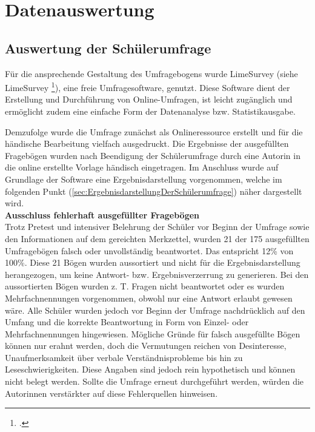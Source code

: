 \section{Datenauswertung}
\label{sec:Datenauswertung}

\subsection{Auswertung der Schülerumfrage}
\label{sec:AuswertungDerSchülerumfrage}

Für die ansprechende Gestaltung des Umfragebogens wurde LimeSurvey (siehe LimeSurvey \footcite {LimeSurvey2015}), eine freie Umfragesoftware, genutzt. Diese Software dient der Erstellung und Durchführung von Online-Umfragen, ist leicht zugänglich und ermöglicht zudem eine einfache Form der Datenanalyse bzw. Statistikausgabe.

Demzufolge wurde die Umfrage zunächst als Onlineressource erstellt und für die händische Bearbeitung vielfach ausgedruckt. Die Ergebnisse der ausgefüllten Fragebögen wurden nach Beendigung der Schülerumfrage durch eine Autorin in die online erstellte Vorlage händisch eingetragen. Im Anschluss wurde auf Grundlage der Software eine Ergebnisdarstellung vorgenommen, welche im folgenden Punkt (\ref{sec:ErgebnisdarstellungDerSchülerumfrage}) näher dargestellt wird.\\

\noindent
\textbf{Ausschluss fehlerhaft ausgefüllter Fragebögen}\\

\noindent
Trotz Pretest und intensiver Belehrung der Schüler vor Beginn der Umfrage sowie den Informationen auf dem gereichten Merkzettel, wurden 21 der 175 ausgefüllten Umfragebögen falsch oder unvollständig beantwortet. Das entspricht 12\% von 100\%. Diese 21 Bögen wurden aussortiert und nicht für die Ergebnisdarstellung herangezogen, um keine Antwort- bzw. Ergebnisverzerrung zu generieren. Bei den aussortierten Bögen wurden z. T. Fragen nicht beantwortet oder es wurden Mehrfachnennungen vorgenommen, obwohl nur eine Antwort erlaubt gewesen wäre. Alle Schüler wurden jedoch vor Beginn der Umfrage nachdrücklich auf den Umfang und die korrekte Beantwortung in Form von Einzel- oder Mehrfachnennungen hingewiesen. Mögliche Gründe für falsch ausgefüllte Bögen können nur erahnt werden, doch die Vermutungen reichen von Desinteresse, Unaufmerksamkeit über verbale Verständnisprobleme bis hin zu Leseschwierigkeiten. Diese Angaben sind jedoch rein hypothetisch und können nicht belegt werden. Sollte die Umfrage erneut durchgeführt werden, würden die Autorinnen verstärkter auf diese Fehlerquellen hinweisen. 

